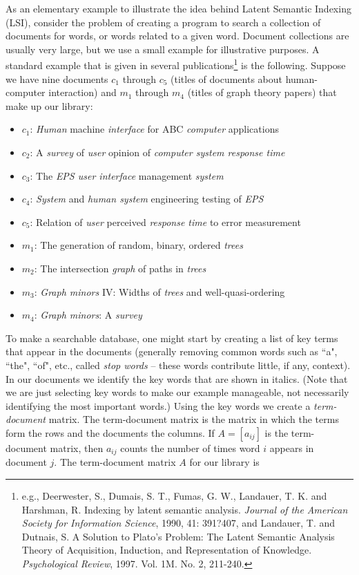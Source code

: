 \ee

\label{sec:proj_indexing}
    
As an elementary example to illustrate the idea behind Latent Semantic Indexing (LSI), consider the problem of creating a program to search a collection of documents for words, or words related to a given word. Document collections are usually very large, but we use a small example for illustrative purposes. A standard example that is given in several publications\footnote{ e.g., Deerwester, S., Dumais, S. T., Fumas, G. W., Landauer, T. K. and Harshman, R. Indexing by latent semantic analysis. \emph{Journal of the American Society for Information Science}, 1990, 41: 391?407, and Landauer, T. and  Dutnais, S. A Solution to Plato's Problem: The Latent Semantic Analysis Theory of Acquisition, Induction, and Representation of Knowledge. \emph{Psychological Review}, 1997. Vol. 1M. No. 2, 211-240.} is the following. Suppose we have nine documents $c_1$ through $c_5$ (titles of documents about human-computer interaction) and $m_1$ through $m_4$ (titles of graph theory papers) that make up our library: 
\begin{itemize}
\setlength{\itemsep}{0pt}%
\item $c_1$: \emph{Human} machine \emph{interface} for ABC \emph{computer} applications
\item $c_2$: A \emph{survey} of \emph{user} opinion of \emph{computer system response time}
\item $c_3$: The \emph{EPS user interface} management \emph{system}
\item $c_4$: \emph{System} and \emph{human system} engineering testing of \emph{EPS}
\item $c_5$: Relation of \emph{user} perceived \emph{response time} to error measurement
\item $m_1$: The generation of random, binary, ordered \emph{trees}
\item $m_2$: The intersection \emph{graph} of paths in \emph{trees}
\item $m_3$: \emph{Graph minors} IV: Widths of \emph{trees} and well-quasi-ordering
\item $m_4$: \emph{Graph minors}: A \emph{survey}
\end{itemize}
To make a searchable database, one might start by creating a list of key terms that appear in the documents (generally removing common words such as ``a", ``the", ``of", etc., called \emph{stop words} -- these words contribute little, if any, context). In our documents we identify the key words that are shown in italics. (Note that we are just selecting key words to make our example manageable, not necessarily identifying the most important words.) Using the key words we create a \emph{term-document} matrix. The term-document matrix is the matrix in which the terms form the rows and the documents the columns. If $A = [a_{ij}]$ is the term-document matrix, then $a_{ij}$ counts the number of times word $i$ appears in document $j$. The term-document matrix $A$ for our library is  
